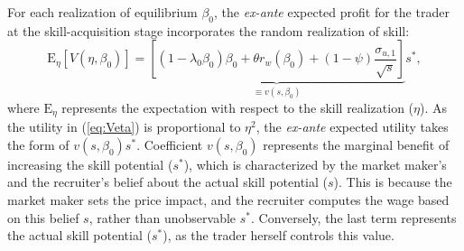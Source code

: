 For each realization of equilibrium $\beta_{0}$, the \textit{ex-ante} expected profit for the trader at the skill-acquisition stage incorporates the random realization of skill: 
\begin{equation}
 \mathrm{E}_{\eta}\left[V(\eta,\beta_{0})\right] =  \underset{\equiv v(s,\beta_{0})}{\underbrace{\left[ (1-\lambda_{0}\beta_{0})\beta_{0}+\theta r_{w}(\beta_{0})+(1-\psi)\frac{\sigma_{u,1}}{\sqrt{s}}\right]}}s^{*}, \label{eq:exanteV}
\end{equation}
where $\mathrm{E}_{\eta}$ represents the expectation with respect to the skill realization ($\eta$). As the utility in (\ref{eq:Veta}) is proportional to $\eta^2$, the \textit{ex-ante} expected utility takes the form of $ v(s,\beta_{0})s^*$. Coefficient $v(s,\beta_{0})$ represents the marginal benefit of increasing the skill potential ($s^*$), which is characterized by the market maker's and the recruiter's belief about the actual skill potential ($s$). This is because the market maker sets the price impact, and the recruiter computes the wage based on this belief $s$, rather than unobservable $s^*$. Conversely, the last term represents the actual skill potential ($s^{*}$), as the trader herself controls this value.